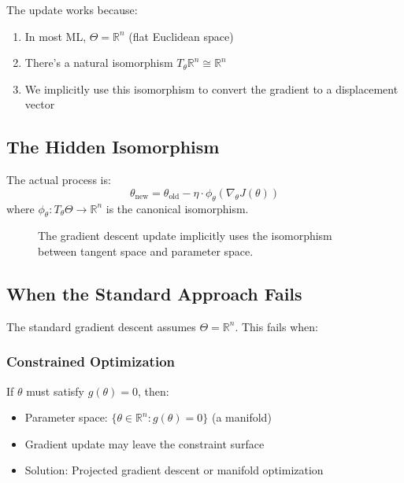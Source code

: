 \begin{notechapter}
The update works because:
\begin{enumerate}
\item In most ML, $\Theta = \mathbb{R}^n$ (flat Euclidean space)
\item There's a natural isomorphism $T_\theta\mathbb{R}^n \cong \mathbb{R}^n$
\item We implicitly use this isomorphism to convert the gradient to a displacement vector
\end{enumerate}

\subsection{The Hidden Isomorphism}

The actual process is:
\[
\theta_{\text{new}} = \theta_{\text{old}} - \eta \cdot \phi_\theta(\nabla_\theta J(\theta))
\]
where $\phi_\theta: T_\theta\Theta \to \mathbb{R}^n$ is the canonical isomorphism.

\begin{figure}[h]
\centering
{}
\caption{The gradient descent update implicitly uses the isomorphism between tangent space and parameter space.}
\end{figure}

\subsection{When the Standard Approach Fails}

The standard gradient descent assumes $\Theta = \mathbb{R}^n$. This fails when:

\subsubsection{Constrained Optimization}
If $\theta$ must satisfy $g(\theta) = 0$, then:
\begin{itemize}
\item Parameter space: $\{\theta \in \mathbb{R}^n : g(\theta) = 0\}$ (a manifold)
\item Gradient update may leave the constraint surface
\item Solution: Projected gradient descent or manifold optimization
\end{itemize}


\end{notechapter}
